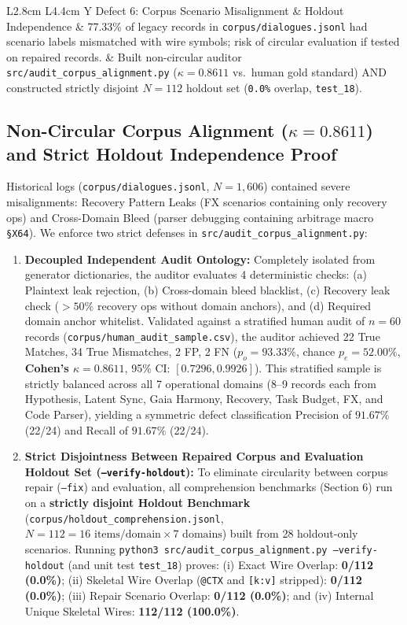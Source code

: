 \documentclass[9pt,a4paper]{extarticle}
\begin{document}
\begin{table}[h!]
\begin{tabularx}{\textwidth}{L{2.8cm} L{4.4cm} Y}
Defect 6: Corpus Scenario Misalignment \& Holdout Independence & 77.33\% of legacy records in \texttt{corpus/\allowbreak dialogues.jsonl} had scenario labels mismatched with wire symbols; risk of circular evaluation if tested on repaired records. & Built non-circular auditor \texttt{src/audit\_\allowbreak corpus\_\allowbreak alignment.py} ($\kappa = 0.8611$ vs.\ human gold standard) AND constructed strictly disjoint $N=112$ holdout set (\texttt{0.0\%} overlap, \texttt{test\_18}). \\
\bottomrule
\end{tabularx}
\end{table}

\subsection{Non-Circular Corpus Alignment ($\kappa = 0.8611$) and Strict Holdout Independence Proof}
Historical logs (\texttt{corpus/dialogues.jsonl}, $N=1{,}606$) contained severe misalignments: Recovery Pattern Leaks (FX scenarios containing only recovery ops) and Cross-Domain Bleed (parser debugging containing arbitrage macro \texttt{\S X64}). We enforce two strict defenses in \texttt{src/audit\_corpus\_alignment.py}:
\begin{enumerate}
  \item \textbf{Decoupled Independent Audit Ontology:} Completely isolated from generator dictionaries, the auditor evaluates 4 deterministic checks: (a) Plaintext leak rejection, (b) Cross-domain bleed blacklist, (c) Recovery leak check ($>50\%$ recovery ops without domain anchors), and (d) Required domain anchor whitelist. Validated against a stratified human audit of $n=60$ records (\texttt{corpus/human\_audit\_sample.csv}), the auditor achieved 22 True Matches, 34 True Mismatches, 2 FP, 2 FN ($p_o = 93.33\%$, chance $p_e = 52.00\%$, \textbf{Cohen's $\kappa = 0.8611$}, 95\% CI: $[0.7296, 0.9926]$). This stratified sample is strictly balanced across all 7 operational domains (8--9 records each from Hypothesis, Latent Sync, Gaia Harmony, Recovery, Task Budget, FX, and Code Parser), yielding a symmetric defect classification Precision of $91.67\%$ (22/24) and Recall of $91.67\%$ (22/24).
  \item \textbf{Strict Disjointness Between Repaired Corpus and Evaluation Holdout Set (\texttt{--verify-holdout}):} To eliminate circularity between corpus repair (\texttt{--fix}) and evaluation, all comprehension benchmarks (Section 6) run on a \textbf{strictly disjoint Holdout Benchmark} (\texttt{corpus/holdout\_comprehension.jsonl}, $N = 112 = 16\text{ items/domain} \times 7\text{ domains}$) built from 28 holdout-only scenarios. Running \texttt{python3 src/audit\_corpus\_alignment.py --verify-holdout} (and unit test \texttt{test\_18}) proves: (i) Exact Wire Overlap: \textbf{0/112 (0.0\%)}; (ii) Skeletal Wire Overlap (\texttt{@CTX} and \texttt{[k:v]} stripped): \textbf{0/112 (0.0\%)}; (iii) Repair Scenario Overlap: \textbf{0/112 (0.0\%)}; and (iv) Internal Unique Skeletal Wires: \textbf{112/112 (100.0\%)}.
\end{enumerate}
\end{document}
